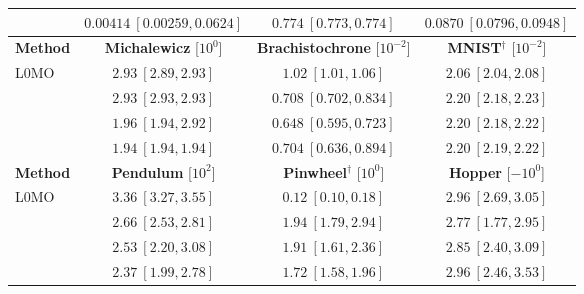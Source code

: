 \begin{table}[!tp]
\begin{tabular}{lccc}
\ourss{} & $\mathbf{0.00414\ [0.00259, 0.0624]}$ & $\mathbf{0.774\ [0.773, 0.774]}$ & $\mathbf{0.0870\ [0.0796, 0.0948]}$ \\
\midrule\midrule
\textbf{Method} & \textbf{Michalewicz} [$10^{0}$] & \textbf{Brachistochrone} [$10^{-2}$] & \textbf{MNIST}$^\dagger$ [$10^{-2}$] \\
\midrule
L0MO & $2.93\ [2.89, 2.93]$ & $1.02\ [1.01, 1.06]$ & $\mathbf{2.06\ [2.04, 2.08]}$ \\
\oursl{} & $2.93\ [2.93, 2.93]$ & $0.708\ [0.702, 0.834]$ & $2.20\ [2.18, 2.23]$ \\
\oursd{} & $1.96\ [1.94, 2.92]$ & $\mathbf{0.648\ [0.595, 0.723]}$ & $2.20\ [2.18, 2.22]$ \\
\ourss{} & $\mathbf{1.94\ [1.94, 1.94]}$ & $\mathbf{0.704\ [0.636, 0.894]}$ & $2.20\ [2.19, 2.22]$ \\
\midrule\midrule
\textbf{Method} & \textbf{Pendulum} [$10^{2}$] & \textbf{Pinwheel}$^\dagger$ [$10^{0}$] & \textbf{Hopper} [$-10^{0}$] \\
\midrule
L0MO & $3.36\ [3.27, 3.55]$ & $\mathbf{0.12\ [0.10, 0.18]}$ & $\mathbf{2.96\ [2.69, 3.05]}$ \\
\oursl{} & $2.66\ [2.53, 2.81]$ & $1.94\ [1.79, 2.94]$ & $2.77\ [1.77, 2.95]$ \\
\oursd{} & $\mathbf{2.53\ [2.20, 3.08]}$ & $1.91\ [1.61, 2.36]$ & $\mathbf{2.85\ [2.40, 3.09]}$ \\
\ourss{} & $\mathbf{2.37\ [1.99, 2.78]}$ & $1.72\ [1.58, 1.96]$ & $\mathbf{2.96\ [2.46, 3.53]}$ \\
\bottomrule
\end{tabular}
\end{table}
